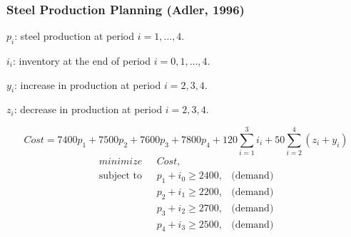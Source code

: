 \documentclass[11pt]{beamer}
\begin{document}
%
%
%
%
%

\begin{frame}
\frametitle{Steel Production Planning (Adler, 1996)}
$p_{i}$: steel production at period $i = 1,\ldots,4$.

$i_{i}$: inventory at the end of period $i = 0,1,\ldots,4$.

$y_{i}$: increase in production at period $i = 2,3,4$.

$z_{i}$: decrease in production at period $i = 2,3,4$.

\pause

\[ Cost = 7400p_1 + 7500p_2 + 7600p_3 + 7800p_4 + 120 \sum_{i=1}^{3} i_i + 50 \sum_{i=2}^{4} (z_i+y_i) \]
\pause
\begin{align}
\displaystyle minimize \mbox{ } & Cost, \label{steel:objective} \\
\mbox{subject to }&p_1 + i_0 \geq 2400, & \mbox{(demand)}  \label{steel:demand}\\
&p_2 + i_1 \geq 2200, & \mbox{(demand)}  \label{steel:demand2}\\
&p_3 + i_2 \geq 2700, & \mbox{(demand)}  \label{steel:demand3}\\
&p_4 + i_3 \geq 2500, & \mbox{(demand)}  \label{steel:demand4}
\end{align}
\end{frame}
\end{document}
